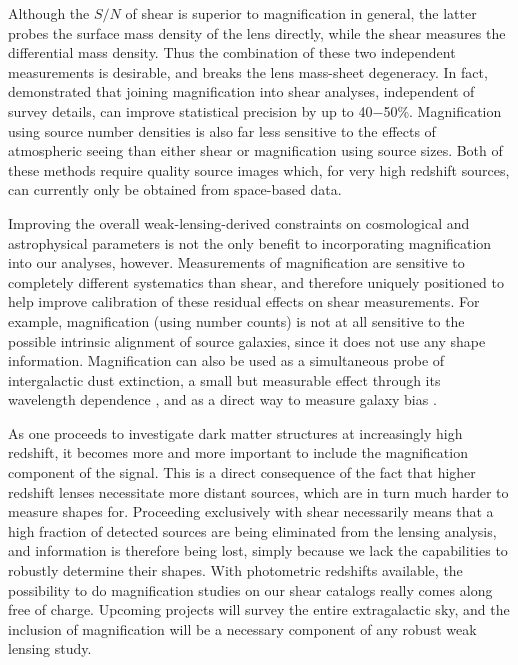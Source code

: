 Although the $S/N$ of shear is superior to magnification in general, the latter probes the surface mass density of the lens directly, while the shear measures the differential mass density.  Thus the combination of these two independent measurements is desirable, and breaks the lens mass-sheet degeneracy. In fact, \citet{RozoSchmidt10} demonstrated that joining magnification into shear analyses, independent of survey details, can improve statistical precision by up to 40$-$50\%. Magnification using source number densities is also far less sensitive to the effects of atmospheric seeing than either shear or magnification using source sizes.  Both of these methods require quality source images which, for very high redshift sources, can currently only be obtained from space-based data.

Improving the overall weak-lensing-derived constraints on cosmological and astrophysical parameters is not the only benefit to incorporating magnification into our analyses, however. Measurements of magnification are sensitive to completely different systematics than shear, and therefore uniquely positioned to help improve calibration of these residual effects on shear measurements. For example, magnification (using number counts) is not at all sensitive to the possible intrinsic alignment of source galaxies, since it does not use any shape information. Magnification can also be used as a simultaneous probe of intergalactic dust extinction, a small but measurable effect through its wavelength dependence \citep{Menard10}, and as a direct way to measure galaxy bias \citep{Waerbeke10}.

As one proceeds to investigate dark matter structures at increasingly high redshift, it becomes more and more important to include the magnification component of the signal. This is a direct consequence of the fact that higher redshift lenses necessitate more distant sources, which are in turn much harder to measure shapes for. Proceeding exclusively with shear necessarily means that a high fraction of detected sources are being eliminated from the lensing analysis, and information is therefore being lost, simply because we lack the capabilities to robustly determine their shapes. With photometric redshifts available, the possibility to do magnification studies on our shear catalogs really comes along free of charge. Upcoming projects will survey the entire extragalactic sky, and the inclusion of magnification will be a necessary component of any robust weak lensing study.
